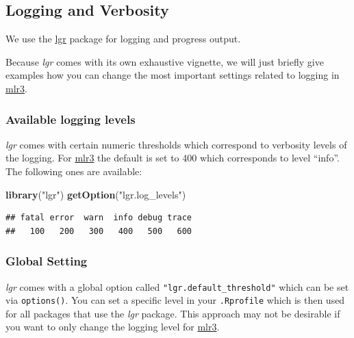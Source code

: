 \documentclass[]{article}
\newenvironment{Shaded}{\begin{snugshade}}{\end{snugshade}}
\newcommand{\KeywordTok}[1]{\textcolor[rgb]{0.13,0.29,0.53}{\textbf{#1}}}
\newcommand{\NormalTok}[1]{#1}
\newcommand{\StringTok}[1]{\textcolor[rgb]{0.31,0.60,0.02}{#1}}
\renewenvironment{Shaded} {\begin{snugshade}\small} {\end{snugshade}}
\begin{document}
\hypertarget{logging}{%
\subsection{Logging and Verbosity}\label{logging}}

We use the \href{https://cran.r-project.org/package=lgr}{lgr} package for logging and progress output.

Because \emph{lgr} comes with its own exhaustive vignette, we will just briefly give examples how you can change the most important settings related to logging in \href{https://mlr3.mlr-org.com}{mlr3}.

\hypertarget{available-logging-levels}{%
\subsubsection{Available logging levels}\label{available-logging-levels}}

\emph{lgr} comes with certain numeric thresholds which correspond to verbosity levels of the logging.
For \href{https://mlr3.mlr-org.com}{mlr3} the default is set to 400 which corresponds to level ``info''.
The following ones are available:

\begin{Shaded}
\begin{Highlighting}[]
\KeywordTok{library}\NormalTok{(}\StringTok{"lgr"}\NormalTok{)}
\KeywordTok{getOption}\NormalTok{(}\StringTok{"lgr.log_levels"}\NormalTok{)}
\end{Highlighting}
\end{Shaded}

\begin{verbatim}
## fatal error  warn  info debug trace 
##   100   200   300   400   500   600
\end{verbatim}

\hypertarget{global-setting}{%
\subsubsection{Global Setting}\label{global-setting}}

\emph{lgr} comes with a global option called \texttt{"lgr.default\_threshold"} which can be set via \texttt{options()}.
You can set a specific level in your \texttt{.Rprofile} which is then used for all packages that use the \emph{lgr} package.
This approach may not be desirable if you want to only change the logging level for \href{https://mlr3.mlr-org.com}{mlr3}.
\end{document}
